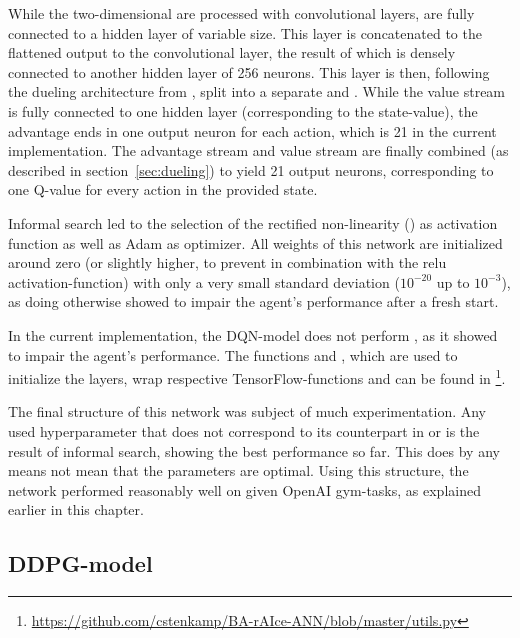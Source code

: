 \noindent While the two-dimensional  are processed with convolutional layers,  are fully connected to a hidden layer of variable size. This layer is concatenated to the flattened output to the convolutional layer, the result of which is densely connected to another hidden layer of 256 neurons. This layer is then, following the dueling architecture from \cite{wang_dueling_2015}, split into a separate  and . While the value stream is fully connected to one hidden layer (corresponding to the state-value), the advantage ends in one output neuron for each action, which is 21 in the current implementation. The advantage stream and value stream are finally combined (as described in section~\ref{sec:dueling}) to yield 21 output neurons, corresponding to one Q-value for every action in the provided state.

Informal search led to the selection of the rectified non-linearity () as activation function as well as Adam\cite{kingma_adam:_2014} as optimizer. All weights of this network are initialized around zero (or slightly higher, to prevent  in combination with the relu activation-function) with only a very small standard deviation ($10^{-20}$ up to $10^{-3}$), as doing otherwise showed to impair the agent's performance after a fresh start.

In the current implementation, the DQN-model does not perform \cite{ioffe_batch_2015}, as it showed to impair the agent's performance. The functions  and , which are used to initialize the layers, wrap respective TensorFlow-functions and can be found in \footnote{\url{https://github.com/cstenkamp/BA-rAIce-ANN/blob/master/utils.py}}.

The final structure of this network was subject of much experimentation. Any used hyperparameter that does not correspond to its counterpart in \cite{mnih_human-level_2015} or \cite{wang_dueling_2015} is the result of informal search, showing the best performance so far. This does by any means not mean that the parameters are optimal. Using this structure, the network performed reasonably well on given OpenAI gym-tasks, as explained earlier in this chapter.


\subsection{DDPG-model}

